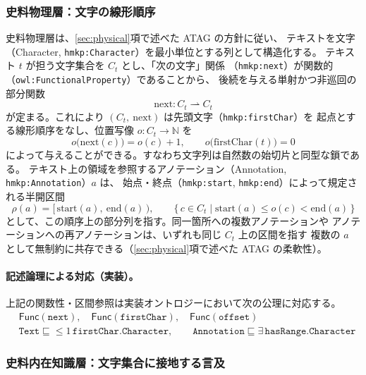 \subsubsection*{史料物理層：文字の線形順序}

史料物理層は、\ref{sec:physical}項で述べた ATAG の方針に従い、
テキストを文字（Character, \texttt{hmkp:Character}）を最小単位とする列として構造化する。
テキスト $t$ が担う文字集合を $C_t$ とし、「次の文字」関係
（\texttt{hmkp:next}）が関数的（\texttt{owl:FunctionalProperty}）であることから、
後続を与える単射かつ非巡回の部分関数
\[
  \mathrm{next}: C_t \rightharpoonup C_t
\]
が定まる。これにより $(C_t,\ \mathrm{next})$ は先頭文字（\texttt{hmkp:firstChar}）を
起点とする線形順序をなし、位置写像 $o : C_t \to \mathbb{N}$ を
\[
  o\bigl(\mathrm{next}(c)\bigr) = o(c)+1, \qquad
  o\bigl(\text{firstChar}(t)\bigr) = 0
\]
によって与えることができる。すなわち文字列は自然数の始切片と同型な鎖である。
テキスト上の領域を参照するアノテーション（Annotation, \texttt{hmkp:Annotation}）$a$ は、
始点・終点（\texttt{hmkp:start}, \texttt{hmkp:end}）によって規定される半開区間
\[
  \rho(a) = \bigl[\,\mathrm{start}(a),\ \mathrm{end}(a)\,\bigr),
  \qquad
  \{\, c \in C_t \mid \mathrm{start}(a) \le o(c) < \mathrm{end}(a)\,\}
\]
として、この順序上の部分列を指す。同一箇所への複数アノテーションや
アノテーションへの再アノテーションは、いずれも同じ $C_t$ 上の区間を指す
複数の $a$ として無制約に共存できる（\ref{sec:physical}項で述べた ATAG の柔軟性）。

\paragraph{記述論理による対応（実装）。}
上記の関数性・区間参照は実装オントロジーにおいて次の公理に対応する。
\begin{align*}
  &\mathsf{Func}(\texttt{next}),\quad
   \mathsf{Func}(\texttt{firstChar}),\quad
   \mathsf{Func}(\texttt{offset}) \\
  &\texttt{Text} \sqsubseteq {\le}1\,\texttt{firstChar}.\texttt{Character},\qquad
   \texttt{Annotation} \sqsubseteq \exists\,\texttt{hasRange}.\texttt{Character}
\end{align*}

\subsubsection*{史料内在知識層：文字集合に接地する言及}


